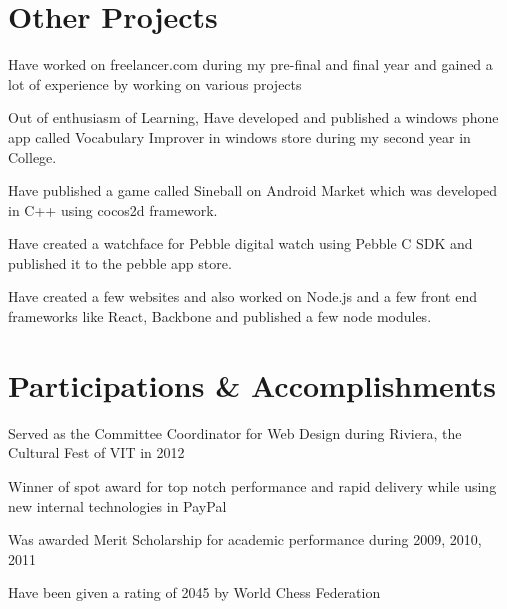 \documentclass[]{deedy-resume-openfont}
\begin{document}
\begin{minipage}[t]{0.66\textwidth}

\section{Other Projects} 
\begin{tightemize}\vspace{\topsep}
\item Have worked on freelancer.com during my pre-final and final year and gained a lot of experience by working on various projects
\item Out of enthusiasm of Learning, Have developed and published a windows phone app called Vocabulary Improver in windows store during my second year in College.
\item Have published a game called Sineball on Android Market which was developed in C++ using cocos2d framework.
\item Have created a watchface for Pebble digital watch using Pebble C SDK and published it to the pebble app store.
\item Have created a few websites and also worked on Node.js and a few front end frameworks like React, Backbone and published a few node modules.\end{tightemize}
\sectionsep


\section{Participations \& Accomplishments} 
\begin{tightemize}\vspace{\topsep}
\item Served as the Committee Coordinator for Web Design during Riviera, the Cultural Fest of VIT in 2012
\item Winner of spot award for top notch performance and rapid delivery while using new internal technologies in PayPal
\item Was awarded Merit Scholarship for academic performance during 2009, 2010, 2011
\item Have been given a rating of 2045 by World Chess Federation\end{tightemize}
\sectionsep

\end{minipage} 
\end{document}
